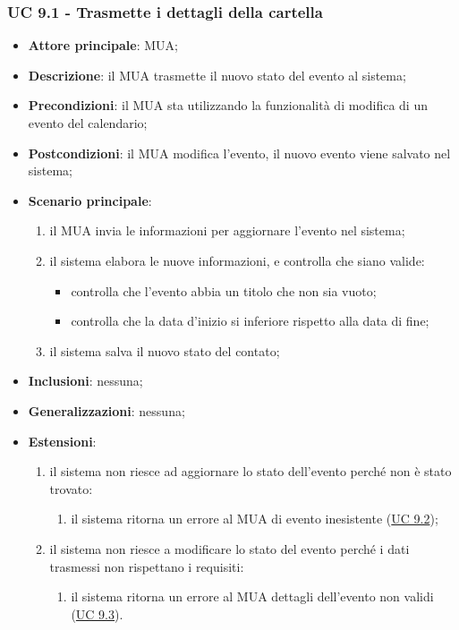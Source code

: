\subsubsection{UC 9.1 - Trasmette i dettagli della cartella} \label{sec:UC9.1}
    \begin{itemize}
        \item \textbf{Attore principale}: MUA;
        \item \textbf{Descrizione}: il MUA trasmette il nuovo stato del evento al sistema;
        \item \textbf{Precondizioni}: il MUA sta utilizzando la funzionalità di modifica di un evento del calendario;
        \item \textbf{Postcondizioni}: il MUA modifica l'evento, il nuovo evento viene salvato nel sistema;
        \item \textbf{Scenario principale}:
            \begin{enumerate}
                \item il MUA invia le informazioni per aggiornare l'evento nel sistema;
                \item il sistema elabora le nuove informazioni, e controlla che siano valide:
                \begin{itemize}
                    \item controlla che l'evento abbia un titolo che non sia vuoto;
                    \item controlla che la data d'inizio si inferiore rispetto alla data di fine;
                \end{itemize}
                \item il sistema salva il nuovo stato del contato;
            \end{enumerate}
        \item \textbf{Inclusioni}: nessuna;
        \item \textbf{Generalizzazioni}: nessuna;
        \item \textbf{Estensioni}: 
            \begin{enumerate}[label=\alph*.]
                \item il sistema non riesce ad aggiornare lo stato dell'evento perché non è stato trovato:
                \begin{enumerate}[label=\arabic*.]
                    \item il sistema ritorna un errore al MUA di evento inesistente (\hyperref[sec:UC9.2]{UC 9.2});
                \end{enumerate}
                \item il sistema non riesce a modificare lo stato del evento perché i dati trasmessi non rispettano i requisiti:
                \begin{enumerate}[label=\arabic*.]
                    \item il sistema ritorna un errore al MUA dettagli dell'evento non validi (\hyperref[sec:U9.3]{UC 9.3}).
                \end{enumerate}
            \end{enumerate}
    \end{itemize}

